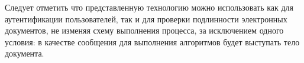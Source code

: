 Следует отметить что представленную технологию можно использовать как для
аутентификации пользователей, так и для проверки подлинности электронных
документов, не изменяя схему выполнения процесса, за исключением одного условия:
в качестве сообщения для выполнения алгоритмов будет выступать тело документа.
